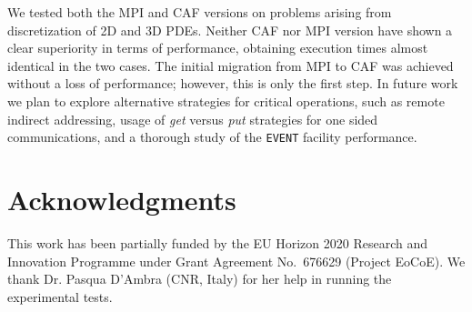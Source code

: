 \documentclass{IOS-Book-Article}
\begin{document}
We tested both the MPI and CAF versions on problems arising from
discretization of 2D and 3D PDEs. Neither CAF nor MPI version have 
shown a clear superiority in terms of performance, obtaining execution times 
almost identical in the two cases.  The initial migration from MPI to CAF
was achieved without  a loss of performance; however, this is only the
first step. In future work we plan to explore %
alternative strategies for critical operations, such as  remote
indirect addressing, usage of \emph{get} versus \emph{put} strategies 
for one sided communications, and a thorough study of the \verb|EVENT|
facility performance. 

\section*{Acknowledgments} 
This work has been partially funded  by the EU Horizon 2020 Research
and Innovation Programme under Grant Agreement No.~676629
(Project EoCoE).
We thank Dr. Pasqua D'Ambra (CNR, Italy) 
for her help in running the experimental tests.
 


\end{document}
